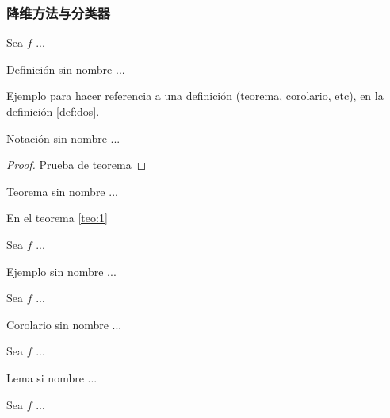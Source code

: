 \documentclass[fleqn]{Paquetes/RevDigMatEduInt}
\begin{document}
\subsubsection{降维方法与分类器}




\begin{definicion}
	Sea $f$ ...
\end{definicion}

\begin{definicion}
Definición sin nombre ...
\end{definicion}

Ejemplo para hacer referencia a una definición (teorema, corolario, etc), en la definición \ref{def:dos}.

\begin{notacion}
	Notación sin nombre ...
\end{notacion}



\begin{proof}
	Prueba de teorema
\end{proof}

\begin{teorema}
Teorema sin nombre ...
\end{teorema}

En el teorema \ref{teo:1}

\begin{ejemplo}
	Sea $f$ ...
\end{ejemplo}

\begin{ejemplo}
	Ejemplo sin nombre ...
\end{ejemplo}

\begin{corolario}
	Sea $f$ ...
\end{corolario}

\begin{corolario}
Corolario sin nombre ...
\end{corolario}

\begin{lema}
Sea $f$ ...
\end{lema}

\begin{lema}
Lema si nombre ...
\end{lema}

\begin{nota}
Sea $f$ ...
\end{nota}
\end{document}
